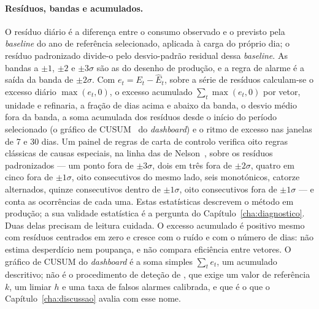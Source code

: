\paragraph{Resíduos, bandas e acumulados.} O resíduo diário é a diferença
entre o consumo observado e o previsto pela \emph{baseline} do ano de
referência selecionado, aplicada à carga do próprio dia; o resíduo
padronizado divide-o pelo desvio-padrão residual dessa \emph{baseline}. As
bandas a $\pm1$, $\pm2$ e $\pm3\sigma$ são as do desenho de produção, e a
regra de alarme é a saída da banda de $\pm2\sigma$. Com $e_t = E_t - \hat E_t$, sobre a série de
resíduos calculam-se o excesso diário $\max(e_t,0)$, o
excesso acumulado $\sum_t \max(e_t,0)$ por vetor, unidade e refinaria, a fração de dias acima
e abaixo da banda, o desvio médio fora da banda, a soma acumulada dos
resíduos desde o início do período selecionado (o gráfico de CUSUM~\cite{Page1954} do
\emph{dashboard}) e o ritmo de excesso nas janelas de 7 e 30 dias. Um
painel de regras de carta de controlo verifica oito regras clássicas de
causas especiais, na linha das de Nelson~\cite{Nelson1984}, sobre os resíduos padronizados --- um ponto fora de $\pm3\sigma$, dois em
três fora de $\pm2\sigma$, quatro em cinco fora de $\pm1\sigma$, oito
consecutivos do mesmo lado, seis monotónicos, catorze alternados, quinze
consecutivos dentro de $\pm1\sigma$, oito consecutivos fora de
$\pm1\sigma$ --- e conta as ocorrências de cada uma. Estas estatísticas
descrevem o método em produção; a sua validade estatística é a pergunta
do Capítulo~\ref{cha:diagnostico}. Duas delas precisam de leitura cuidada.
O excesso acumulado é positivo mesmo com resíduos centrados em zero e cresce
com o ruído e com o número de dias: não estima desperdício nem poupança, e
não compara eficiência entre vetores. O gráfico de CUSUM do
\emph{dashboard} é a soma simples $\sum_t e_t$, um acumulado descritivo; não
é o procedimento de deteção de \textcite{Page1954}, que exige um valor de
referência $k$, um limiar $h$ e uma taxa de falsos alarmes calibrada, e que
é o que o Capítulo~\ref{cha:discussao} avalia com esse nome.

